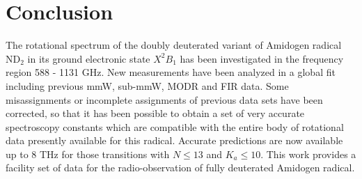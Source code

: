 \documentclass[twocolumn]{aastex61}
\begin{document}
\section{Conclusion}
The rotational spectrum of the doubly deuterated variant of Amidogen radical ND$_{2}$ in its ground electronic state $X^{2}B_{1}$ 
has been investigated in the frequency region 588 - 1131 GHz. New measurements have been analyzed in a global fit including 
previous mmW, sub-mmW, MODR and FIR data. Some misassignments or incomplete assignments of previous data sets have been corrected, 
so that it has been possible to obtain a set of very accurate spectroscopy constants which are compatible with the entire body of 
rotational data presently available for this radical. Accurate predictions are now available up to 8 THz for those transitions 
with $N\leqslant13$ and $K_{a}\leqslant10$. This work provides a facility set of data for the radio-observation of fully deuterated Amidogen radical.
\end{document}

